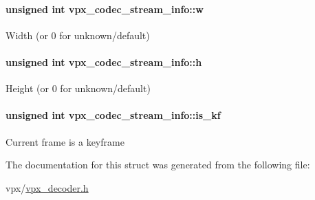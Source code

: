 \paragraph[{\texorpdfstring{w}{w}}]{\setlength{\rightskip}{0pt plus 5cm}unsigned int vpx\+\_\+codec\+\_\+stream\+\_\+info\+::w}\hypertarget{structvpx__codec__stream__info_a957dbfa83c93d9b3dc08498a6b97c77d}{}\label{structvpx__codec__stream__info_a957dbfa83c93d9b3dc08498a6b97c77d}
Width (or 0 for unknown/default) 
\paragraph[{\texorpdfstring{h}{h}}]{\setlength{\rightskip}{0pt plus 5cm}unsigned int vpx\+\_\+codec\+\_\+stream\+\_\+info\+::h}\hypertarget{structvpx__codec__stream__info_af7a8b114547e434d182c722bdace63a0}{}\label{structvpx__codec__stream__info_af7a8b114547e434d182c722bdace63a0}
Height (or 0 for unknown/default) 
\paragraph[{\texorpdfstring{is\+\_\+kf}{is_kf}}]{\setlength{\rightskip}{0pt plus 5cm}unsigned int vpx\+\_\+codec\+\_\+stream\+\_\+info\+::is\+\_\+kf}\hypertarget{structvpx__codec__stream__info_a8c9060997f16d43219462554c882dbd3}{}\label{structvpx__codec__stream__info_a8c9060997f16d43219462554c882dbd3}
Current frame is a keyframe 

The documentation for this struct was generated from the following file\+:\begin{DoxyCompactItemize}
\item 
vpx/\hyperlink{vpx__decoder_8h}{vpx\+\_\+decoder.\+h}\end{DoxyCompactItemize}
